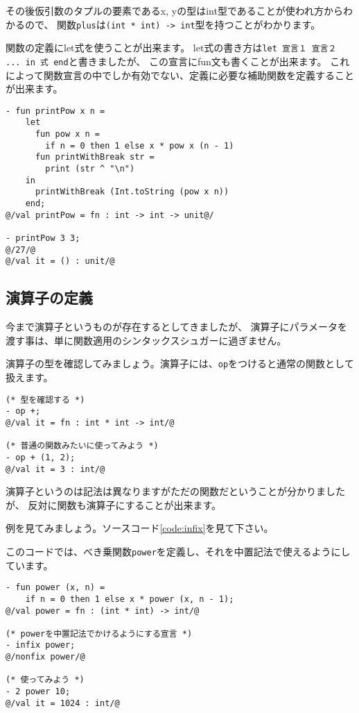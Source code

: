 \documentclass[11pt,a4paper]{article}
\begin{document}
その後仮引数のタプルの要素であるx, yの型はint型であることが使われ方からわかるので、
関数\lstinline{plus}は\lstinline{(int * int) -> int}型を持つことがわかります。

関数の定義にlet式を使うことが出来ます。
let式の書き方は\lstinline{let 宣言１ 宣言２ ... in 式 end}と書きましたが、
この宣言にfun文も書くことが出来ます。
これによって関数宣言の中でしか有効でない、定義に必要な補助関数を定義することが出来ます。

\begin{lstlisting}[caption=ネストした関数宣言,label=code:nested-fun]
- fun printPow x n =
    let
      fun pow x n =
        if n = 0 then 1 else x * pow x (n - 1)
      fun printWithBreak str =
        print (str ^ "\n")
    in
      printWithBreak (Int.toString (pow x n))
    end;
@/val printPow = fn : int -> int -> unit@/

- printPow 3 3;
@/27/@
@/val it = () : unit/@
\end{lstlisting}

\subsection{演算子の定義}
今まで演算子というものが存在するとしてきましたが、
演算子にパラメータを渡す事は、単に関数適用のシンタックスシュガーに過ぎません。

演算子の型を確認してみましょう。演算子には、\lstinline{op}をつけると通常の関数として扱えます。
\begin{lstlisting}[caption=演算子を評価する]
(* 型を確認する *)
- op +;
@/val it = fn : int * int -> int/@

(* 普通の関数みたいに使ってみよう *)
- op + (1, 2);
@/val it = 3 : int/@
\end{lstlisting}

演算子というのは記法は異なりますがただの関数だということが分かりましたが、
反対に関数も演算子にすることが出来ます。

例を見てみましょう。ソースコード\ref{code:infix}を見て下さい。

このコードでは、べき乗関数\lstinline{power}を定義し、それを中置記法で使えるようにしています。

\begin{lstlisting}[caption=演算子の定義,label=code:infix]
- fun power (x, n) =
    if n = 0 then 1 else x * power (x, n - 1);
@/val power = fn : (int * int) -> int/@

(* powerを中置記法でかけるようにする宣言 *)
- infix power;
@/nonfix power/@

(* 使ってみよう *)
- 2 power 10;
@/val it = 1024 : int/@
\end{lstlisting}
\end{document}
